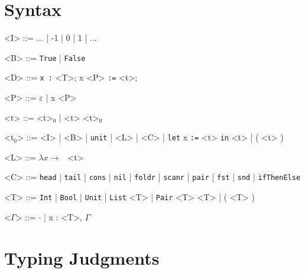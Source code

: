 \documentclass[10pt]{article}
\newcommand{\ttt}[1]{\texttt{#1}}
\newcommand{\ra}{\ensuremath{\rightarrow\;\,}}
\begin{document}
\section{Syntax}

\begin{grammar}
  <I> ::= ... | -1 | 0 | 1 | ...

  <B> ::= \ttt{True} | \ttt{False}

  <D> ::= \ttt{x :} <T>; x <P> \ttt{:=} <t>;

  <P> ::= $\varepsilon$ | x <P>

  <t> ::= <t>$_0$ | <t> <t>$_0$

  <t$_0$> ::= <I> | <B> | \ttt{unit} | <L> | <C> | \ttt{let} x \ttt{:=} <t> \ttt{in} <t> | ( <t> )

  <L> ::= $\lambda x \ra$ <t>

  <C> ::= \ttt{head} | \ttt{tail} | \ttt{cons} | \ttt{nil} | \ttt{foldr} | \ttt{scanr} | \ttt{pair} | \ttt{fst} | \ttt{snd} | \ttt{ifThenElse}

  <T> ::= \ttt{Int} | \ttt{Bool} | \ttt{Unit} | \ttt{List} <T> | \ttt{Pair} <T> <T> | ( <T> )

  <$\Gamma$> ::= $\cdot$ | x : <T>, $\Gamma$
\end{grammar}

\section{Typing Judgments}
\end{document}
